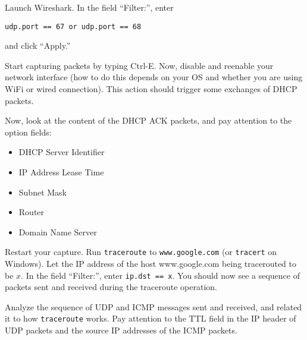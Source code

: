 \documentclass[a4paper,11pt]{exam}
\begin{document}
\begin{questions}

\question Launch Wireshark.  In the field ``Filter:'', enter 
\begin{verbatim}
udp.port == 67 or udp.port == 68
\end{verbatim}
and click ``Apply.''

Start capturing packets by typing Ctrl-E.  Now, disable and reenable your network interface (how to do this depends on your OS and whether you are using WiFi or wired connection).  This action should trigger some exchanges of DHCP packets.  

Now, look at the content of the DHCP ACK packets, and pay attention to the option fields:
\begin{itemize}
	\item DHCP Server Identifier
	\item IP Address Lease Time
	\item Subnet Mask
	\item Router
	\item Domain Name Server
\end{itemize}


\question
Restart your capture.  Run \texttt{traceroute} to \texttt{www.google.com}
(or \texttt{tracert} on Windows).  Let the IP address of the host www.google.com being tracerouted to be $x$.  In the field ``Filter:'', enter \texttt{ip.dst == x}.  You should now see a sequence of packets sent and received during the traceroute operation.

Analyze the sequence of UDP and ICMP messages sent and received, and related it to how \texttt{traceroute} works.  Pay attention to the TTL field in the IP header of UDP packets and the source IP addresses of the ICMP packets.


\end{questions}
\end{document}
